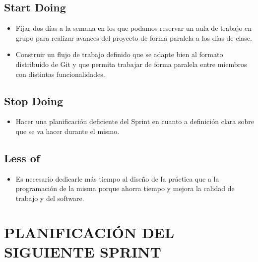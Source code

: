 \documentclass{article}
\begin{document}
\subsection{Start Doing}
\begin{itemize}
\item Fijar dos días a la semana en los que podamos reservar un aula de trabajo en grupo para realizar avances del proyecto de forma paralela a los días de clase.

\item Construir un flujo de trabajo definido que se adapte bien al formato distribuido de Git y que permita trabajar de forma paralela entre miembros con distintas funcionalidades.
\end{itemize}

\subsection{Stop Doing}
\begin{itemize}
\item Hacer una planificación deficiente del Sprint en cuanto a definición clara sobre que se va hacer durante el mismo.
\end{itemize}

\subsection{Less of}
\begin{itemize}
\item Es necesario dedicarle más tiempo al diseño de la práctica que a la programación de la misma porque ahorra tiempo y mejora la calidad de trabajo y del software.
\end{itemize}

\section{PLANIFICACIÓN DEL SIGUIENTE SPRINT}
\end{document}
